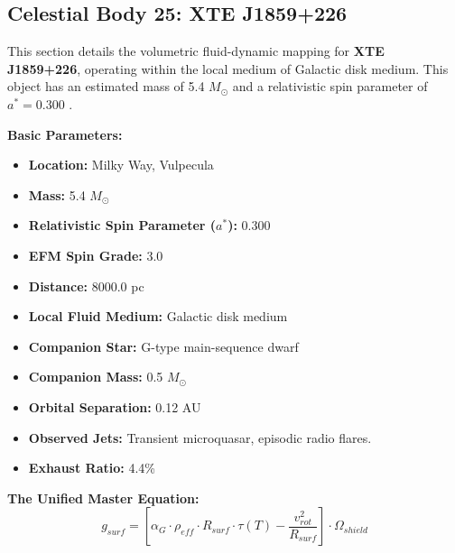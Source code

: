 \documentclass[11pt, a4paper]{article}
\begin{document}
\clearpage
\subsection{Celestial Body 25: XTE J1859+226}
This section details the volumetric fluid-dynamic mapping for \textbf{XTE J1859+226}, operating within the local medium of Galactic disk medium. This object has an estimated mass of 5.4 $M_{\odot}$ and a relativistic spin parameter of $a^* = 0.300$ \cite{corral-santana2011, simbad}.

\vspace{0.5em}
\noindent \textbf{Basic Parameters:}
\begin{itemize}
  \item \textbf{Location:} Milky Way, Vulpecula
  \item \textbf{Mass:} 5.4 $M_{\odot}$
  \item \textbf{Relativistic Spin Parameter ($a^*$):} 0.300
  \item \textbf{EFM Spin Grade:} 3.0
  \item \textbf{Distance:} 8000.0 pc
  \item \textbf{Local Fluid Medium:} Galactic disk medium
  \item \textbf{Companion Star:} G-type main-sequence dwarf
  \item \textbf{Companion Mass:} 0.5 $M_{\odot}$
  \item \textbf{Orbital Separation:} 0.12 AU
  \item \textbf{Observed Jets:} Transient microquasar, episodic radio flares.
  \item \textbf{Exhaust Ratio:} 4.4\%
\end{itemize}

\vspace{0.5em}
\noindent \textbf{The Unified Master Equation:}
$$ g_{surf} = \left[ \alpha_G \cdot \rho_{eff} \cdot R_{surf} \cdot \tau(T) - \frac{v_{rot}^2}{R_{surf}} \right] \cdot \Omega_{shield} $$
\end{document}
